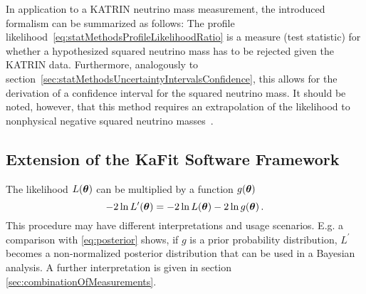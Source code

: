 In application to a KATRIN neutrino mass measurement, the introduced formalism can be summarized as follows: The profile likelihood~\eqref{eq:statMethodsProfileLikelihoodRatio} is a measure (test statistic) for whether a hypothesized squared neutrino mass has to be rejected given the KATRIN data. Furthermore, analogously to section~\ref{sec:statMethodsUncertaintyIntervalsConfidence}, this allows for the derivation of a confidence interval for the squared neutrino mass. It should be noted, however, that this method requires an extrapolation of the likelihood to nonphysical negative squared neutrino masses~\cite{Kleesiek2014}.







\subsection{Extension of the KaFit Software Framework}
\label{sec:statLikelihoodExtImpl}
The likelihood $L(\boldsymbol{\mathbf{\theta}})$ can be multiplied by a function $g(\boldsymbol{\mathbf{\theta}})$
\begin{equation}
\label{eq:likelihoodExtension}
-2\ln L^\prime(\boldsymbol{\mathbf{\theta}}) = -2\ln L(\boldsymbol{\mathbf{\theta}}) -2\ln g(\boldsymbol{\mathbf{\theta}})
\text{\,.}
\end{equation}
This procedure may have different interpretations and usage scenarios. E.g. a comparison with \eqref{eq:posterior} shows, if $g$ is a prior probability distribution, $L^\prime$ becomes a non-normalized posterior distribution that can be used in a Bayesian analysis. A further interpretation is given in section \ref{sec:combinationOfMeasurements}.
\label{sec:combinationOfMeasurements}


